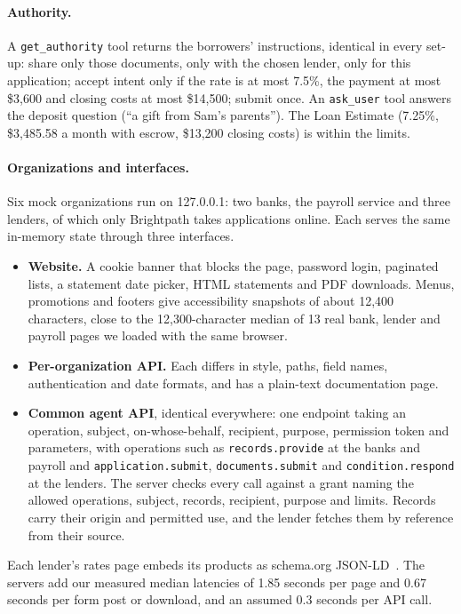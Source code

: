 \documentclass[11pt]{article}
\begin{document}
\paragraph{Authority.} A \texttt{get\_authority} tool returns the borrowers' instructions, identical in every set-up: share only those documents, only with the chosen lender, only for this application; accept intent only if the rate is at most 7.5\%, the payment at most \$3{,}600 and closing costs at most \$14{,}500; submit once. An \texttt{ask\_user} tool answers the deposit question (``a gift from Sam's parents''). The Loan Estimate (7.25\%, \$3{,}485.58 a month with escrow, \$13{,}200 closing costs) is within the limits.

\paragraph{Organizations and interfaces.} Six mock organizations run on 127.0.0.1: two banks, the payroll service and three lenders, of which only Brightpath takes applications online. Each serves the same in-memory state through three interfaces.
\begin{itemize}
\item \textbf{Website.} A cookie banner that blocks the page, password login, paginated lists, a statement date picker, HTML statements and PDF downloads. Menus, promotions and footers give accessibility snapshots of about 12{,}400 characters, close to the 12{,}300-character median of 13 real bank, lender and payroll pages we loaded with the same browser.
\item \textbf{Per-organization API.} Each differs in style, paths, field names, authentication and date formats, and has a plain-text documentation page.
\item \textbf{Common agent API}, identical everywhere: one endpoint taking an operation, subject, on-whose-behalf, recipient, purpose, permission token and parameters, with operations such as \texttt{records.provide} at the banks and payroll and \texttt{application.submit}, \texttt{documents.submit} and \texttt{condition.respond} at the lenders. The server checks every call against a grant naming the allowed operations, subject, records, recipient, purpose and limits. Records carry their origin and permitted use, and the lender fetches them by reference from their source.
\end{itemize}
Each lender's rates page embeds its products as schema.org JSON-LD~\cite{schemaorg}. The servers add our measured median latencies of 1.85 seconds per page and 0.67 seconds per form post or download, and an assumed 0.3 seconds per API call.
\end{document}
